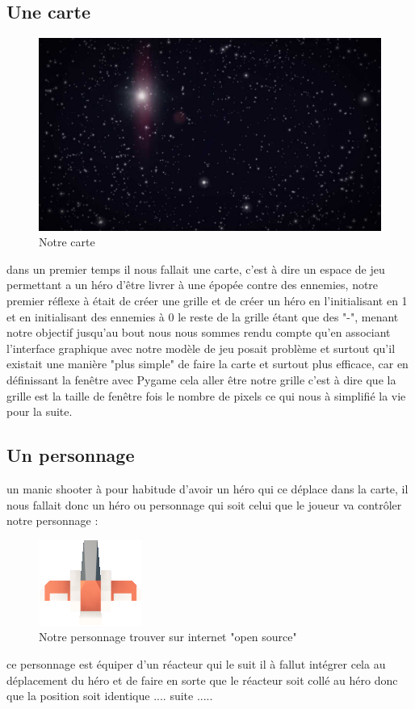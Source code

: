 \documentclass[a4paper, 11pt]{article}
\begin{document}
 	\subsection{Une carte}
 	\begin{figure}[ht!]
\centering
\includegraphics[width=0.8\linewidth]{Background.jpg}
\caption{Notre carte}
\end{figure}
 	dans un premier temps il nous fallait une carte, c'est à dire un espace de jeu permettant a un héro d'être livrer à une épopée contre des ennemies,
 	notre premier réflexe à était de créer une grille et de créer un héro en l'initialisant en 1 et en initialisant des ennemies à 0 le reste de la grille étant que des "-", menant notre objectif jusqu'au bout nous nous sommes rendu compte qu'en associant l'interface graphique avec notre modèle de jeu posait problème et surtout qu'il existait une manière "plus simple" de faire la carte et surtout plus efficace, car en définissant la fenêtre avec Pygame cela aller être notre grille c'est à dire que la grille est la taille de fenêtre fois le nombre de pixels ce qui nous à simplifié la vie pour la suite.

 	
	\subsection{Un personnage}
un manic shooter à pour habitude d'avoir un héro qui ce déplace dans la carte, il nous fallait donc un héro ou personnage qui soit celui que le joueur va contrôler notre personnage :
\begin{figure}[ht!]
\centering
\includegraphics[width=0.1\linewidth]{spaceCraft1.png}
\caption{Notre personnage trouver sur internet "open source"}
\end{figure}
ce personnage est équiper d'un réacteur qui le suit il à fallut intégrer cela au déplacement du héro et de faire en sorte que le réacteur soit collé au héro donc que la position soit identique .... suite .....
\end{document}
